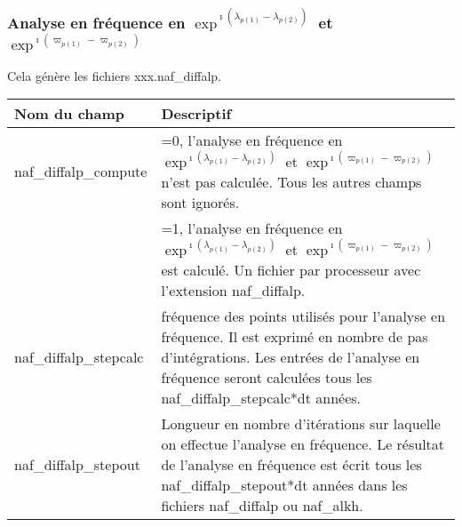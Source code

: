 \documentclass[11pt]{article}
\begin{document}
\vspace{0.5cm}
\subsubsection*{Analyse en fr\'equence en $\exp^{\imath(\lambda_{p(1)}-\lambda_{p(2)})}$ et $\exp^{\imath(\varpi_{p(1)}-\varpi_{p(2)})}$}
Cela g\'en\`ere les fichiers xxx.naf\_diffalp.

\begin{tabularx}{\textwidth}{|l|X|}
\hline
Nom du champ& Descriptif \\ \hline \hline
naf\_diffalp\_compute &=0, l'analyse en fr\'equence en $\exp^{\imath(\lambda_{p(1)}-\lambda_{p(2)})}$ et $\exp^{\imath(\varpi_{p(1)}-\varpi_{p(2)})}$ n'est pas calcul\'ee. Tous les autres champs sont ignor\'es.\\
&=1, l'analyse en fr\'equence en  $\exp^{\imath(\lambda_{p(1)}-\lambda_{p(2)})}$ et $\exp^{\imath(\varpi_{p(1)}-\varpi_{p(2)})}$ est calcul\'e. Un fichier par processeur avec l'extension naf\_diffalp.\\ \hline

naf\_diffalp\_stepcalc  & fr\'equence des points utilis\'es pour l'analyse en fr\'equence. Il est exprim\'e en nombre de pas d'int\'egrations. Les entr\'ees de l'analyse en fr\'equence seront calcul\'ees tous les naf\_diffalp\_stepcalc*dt ann\'ees. \\ \hline

naf\_diffalp\_stepout  & Longueur en nombre d'it\'erations sur laquelle on effectue l'analyse en fr\'equence. Le r\'esultat de l'analyse en fr\'equence est \'ecrit tous les naf\_diffalp\_stepout*dt ann\'ees dans les fichiers naf\_diffalp ou naf\_alkh.\\ \hline


\end{tabularx}
\end{document}
